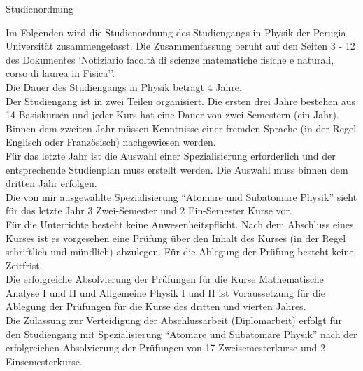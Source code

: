 \documentclass[a4paper,11pt]{article}
\begin{document}
\pagestyle{empty}
\begin{center}
  \huge{Studienordnung}
\end{center}
\vspace{1cm}

Im Folgenden wird die Studienordnung des Studiengangs in Physik der
Perugia Universit\"at zusammengefasst. Die Zusammenfassung beruht auf den
Seiten 3 - 12 des Dokumentes `Notiziario facolt\`a di scienze matematiche
fisiche e naturali, corso di laurea in Fisica''.\\

Die Dauer des Studiengangs in Physik betr\"agt 4 Jahre.\\

Der Studiengang ist in zwei Teilen organisiert. Die ersten drei Jahre bestehen
aus 14 Basiskursen und jeder Kurs hat eine Dauer von zwei Semestern (ein
Jahr).\\

Binnen dem zweiten Jahr m\"ussen Kenntnisse einer fremden Sprache (in der Regel
Englisch oder Franz\"osisch) nachgewiesen werden.\\

F\"ur das letzte Jahr ist die Auswahl einer Spezialisierung erforderlich und der
entsprechende Studienplan muss erstellt werden. Die Auswahl muss binnen dem
dritten Jahr erfolgen.\\

Die von mir ausgew\"ahlte Spezialisierung ``Atomare und Subatomare Physik''
sieht f\"ur das letzte Jahr 3 Zwei-Semester und 2 Ein-Semester Kurse vor.
\\

F\"ur die Unterrichte besteht keine Anwesenheitspflicht. Nach dem Abschluss
eines Kurses ist es vorgesehen eine Pr\"ufung \"uber den Inhalt des Kurses (in
der Regel schriftlich und m\"undlich) abzulegen. F\"ur die Ablegung der
Pr\"ufung besteht keine Zeitfrist.\\

Die erfolgreiche Absolvierung der Pr\"ufungen f\"ur die Kurse Mathematische
Analyse I und II und Allgemeine Physik I und II ist Voraussetzung f\"ur die Ablegung der
Pr\"ufungen f\"ur die Kurse des dritten und vierten Jahres.\\

Die Zulassung zur Verteidigung der Abschlussarbeit (Diplomarbeit) erfolgt f\"ur
den Studiengang mit Spezialisierung ``Atomare und Subatomare Physik'' nach der
erfolgreichen Absolvierung der Pr\"ufungen von 17 Zweisemesterkurse und 2
Einsemesterkurse.\\
\end{document}
